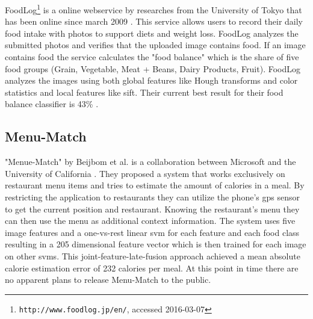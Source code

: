 FoodLog\footnote{\texttt{http://www.foodlog.jp/en/}, accessed 2016-03-07} is a online webservice by researches from the University of Tokyo that has been online since march 2009 \cite{Kitamura2008, Kitamura2009, Kitamura2010}. This service allows users to record their daily food intake with photos to support diets and weight loss. FoodLog analyzes the submitted photos and verifies that the uploaded image contains food. If an image contains food the service calculates the "food balance" which is the share of five food groups {(Grain, Vegetable, Meat + Beans, Dairy Products, Fruit)}. FoodLog analyzes the images using both global features like Hough transforms and color statistics and local features like \gls{sift}. Their current best result for their food balance classifier is 43\% \cite{Kitamura2010}.

\subsection{Menu-Match}
"Menue-Match" by Beijbom et al. \cite{Beijbom2015} is a collaboration between Microsoft and the University of California . They proposed a system that works exclusively on restaurant menu items and tries to estimate the amount of calories in a meal. By restricting the application to restaurants they can utilize the phone's \gls{gps} sensor to get the current position and restaurant. Knowing the restaurant's menu they can then use the menu as additional context information. The system uses five image features and a one-vs-rest linear \gls{svm} for each feature and each food class resulting in a 205 dimensional feature vector which is then trained for each image on other \glspl{svm}. This joint-feature-late-fusion approach achieved a mean absolute calorie estimation error of 232 calories per meal. At this point in time there are no apparent plans to release Menu-Match to the public. 

